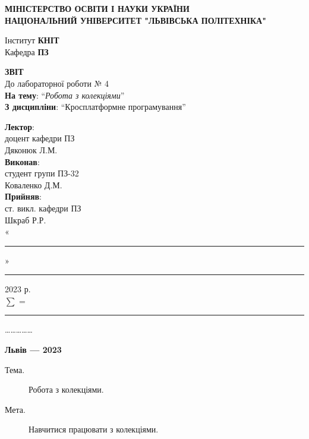 \documentclass[14pt]{extreport}
\newcommand\subject{Кросплатформне програмування}
\newcommand\lecturer{доцент кафедри ПЗ\\Дяконюк Л.М.}
\newcommand\teacher{ст. викл. кафедри ПЗ\\Шкраб Р.Р.}
\newcommand\mygroup{ПЗ-32}
\newcommand\lab{4}
\newcommand\theme{Робота з колекціями}
\newcommand\purpose{Навчитися працювати з колекціями}
\begin{document}
\begin{normalsize}
	\begin{titlepage}
		\thispagestyle{empty}
		\begin{center}
			\textbf{МІНІСТЕРСТВО ОСВІТИ І НАУКИ УКРАЇНИ\\
				НАЦІОНАЛЬНИЙ УНІВЕРСИТЕТ "ЛЬВІВСЬКА ПОЛІТЕХНІКА"}
		\end{center}
		\begin{flushright}
			Інститут \textbf{КНІТ}\\
			Кафедра \textbf{ПЗ}
		\end{flushright}
		\vspace{160pt}
		\begin{center}
			\textbf{ЗВІТ}\\
			\vspace{10pt}
			До лабораторної роботи № \lab\\
			\textbf{На тему}: “\textit{\theme}”\\
			\textbf{З дисципліни}: “\subject”
		\end{center}
		\vspace{40pt}
		\begin{flushright}
			
			\textbf{Лектор}:\\
			\lecturer\\
			\vspace{10pt}
			\textbf{Виконав}:\\
			
			студент групи \mygroup\\
			Коваленко Д.М.\\
			\vspace{10pt}
			\textbf{Прийняв}:\\
			
			\teacher\\
			
			\vspace{28pt}
			«\rule{1cm}{0.15mm}» \rule{1.5cm}{0.15mm} 2023 р.\\
			$\sum$ = \rule{1cm}{0.15mm}……………\\
			
		\end{flushright}
		\vspace{\fill}
		\begin{center}
			\textbf{Львів — 2023}
		\end{center}
	\end{titlepage}
		
	\begin{description}
		\item[Тема.] \theme.
		\item[Мета.] \purpose.
	\end{description}
	


\end{normalsize}
\end{document}
